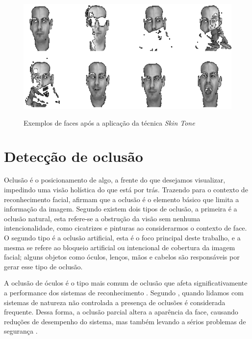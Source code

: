 \begin{figure}[H]
\centering
\caption{Exemplos de faces após a aplicação da técnica \textit{Skin Tone}}
\includegraphics[scale = 0.70]{imgs/skin.png}
\label{fig:skincolor}
\end{figure}


 

\section{Detecção de oclusão}
\label{sec:det.occlusão}
Oclusão é o posicionamento de algo, a frente do que desejamos visualizar, impedindo uma visão holística do que está por trás. Trazendo para o contexto de reconhecimento facial,  afirmam que a oclusão é o elemento básico que limita a informação da imagem. Segundo  existem dois tipos de oclusão, a primeira é a oclusão natural, esta refere-se a obstrução da visão sem nenhuma intencionalidade, como cicatrizes e pinturas ao considerarmos o contexto de face. O segundo tipo é a oclusão artificial, esta é o foco principal deste trabalho, e a mesma se refere ao bloqueio artificial ou intencional de cobertura da imagem facial; alguns objetos como óculos, lenços, mãos e cabelos são responsáveis por gerar esse tipo de oclusão. 

A oclusão de óculos é o tipo mais comum de oclusão que afeta significativamente a performance dos sistemas de reconhecimento \cite{park2005glasses}.  Segundo , quando lidamos com sistemas de natureza não controlada a presença de oclusões é considerada frequente. Dessa forma, a oclusão parcial altera a aparência da face, causando reduções de desempenho do sistema, mas também levando a sérios problemas de segurança \cite{oloyede2017evaluating}.

